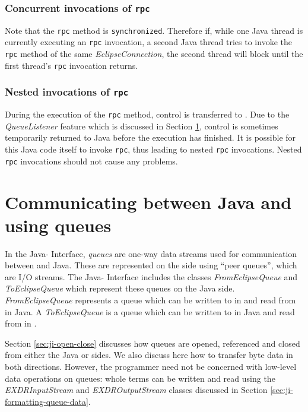 \subsubsection*{Concurrent invocations of {\tt rpc}}

Note that the {\tt rpc} method is {\tt synchronized}. Therefore if,
while one Java thread is currently executing an {\tt rpc} invocation,
a second Java thread tries to invoke the {\tt rpc} method of the same
{\it EclipseConnection}, the second thread will block until the first
thread's {\tt rpc} invocation returns.

\subsubsection*{Nested invocations of {\tt rpc}}

During the execution of the {\tt rpc} method, control
 is transferred to {\eclipse}. Due to the {\it QueueListener} feature
  which is discussed in Section
 \ref{sec:ji-using-queue-streams}, control is sometimes temporarily
 returned to Java before the {\eclipse} execution has finished. It is
 possible for this Java code itself to invoke {\tt rpc}, thus leading to nested {\tt rpc}
 invocations. Nested {\tt rpc} invocations should not
 cause any problems.

\section{Communicating between Java and {\eclipse} using queues} 
\label{sec:ji-using-queue-streams}

In the Java-{\eclipse} Interface, {\it queues} are one-way data
streams used for communication between {\eclipse} and Java. These are
represented on the {\eclipse} side using ``peer queues'', which are 
I/O streams. The Java-{\eclipse} Interface includes the classes {\it
FromEclipseQueue} and {\it ToEclipseQueue} which represent these
queues on the Java side. {\it FromEclipseQueue} represents a queue
which can be written to in {\eclipse} and read from in Java. A {\it
ToEclipseQueue} is a queue which can be written to in Java and read
from in {\eclipse}.

Section \ref{sec:ji-open-close} discusses how queues are opened,
referenced and closed from either the Java 
or {\eclipse} sides. We also discuss here how to transfer byte data in both
directions. However, the programmer need not be concerned with low-level
data operations on queues: whole terms can be written and read using the
{\it EXDRInputStream} and {\it EXDROutputStream} classes discussed in
Section
\ref{sec:ji-formatting-queue-data}.

